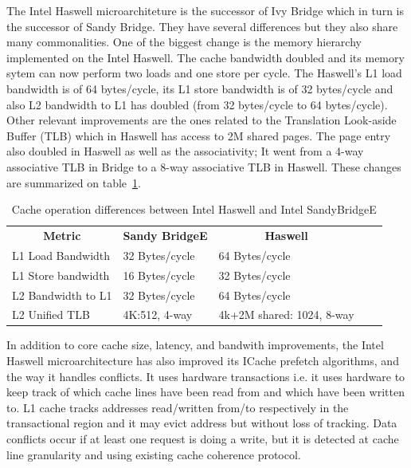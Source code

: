 The Intel Haswell microarchiteture is the successor of Ivy Bridge which in turn is the successor of Sandy Bridge. They have several differences but they also share many commonalities. One of the biggest change is the memory hierarchy implemented on the Intel Haswell. The cache bandwidth doubled and its memory sytem can now perform two loads and one store per cycle. The Haswell's L1 load bandwidth is of 64 bytes/cycle, its L1 store bandwidth is of 32 bytes/cycle and also L2 bandwidth to L1 has doubled (from 32 bytes/cycle to 64 bytes/cycle). Other relevant improvements are the ones related to the Translation Look-aside Buffer (TLB) which in Haswell has access to 2M shared pages. The page entry also doubled in Haswell as well as the associativity; It went from a 4-way associative TLB in 
 Bridge to a 8-way associative TLB in Haswell. These changes are summarized on table~\ref{tab:haswell_ivy}.

\begin{table}[ht]
\footnotesize
\begin{tabular}{|l|l|l|ll}
\cline{1-3}
\multicolumn{1}{|c|}{\textbf{Metric}} & \multicolumn{1}{c|}{\textbf{Sandy BridgeE}} & \multicolumn{1}{c|}{\textbf{Haswell}} &  &  \\ \cline{1-3}
L1 Load Bandwidth                     & 32 Bytes/cycle                           & 64 Bytes/cycle                        &  &  \\ \cline{1-3}
L1 Store bandwidth                    & 16 Bytes/cycle                           & 32 Bytes/cycle                        &  &  \\ \cline{1-3}
L2 Bandwidth to L1                    & 32 Bytes/cycle                           & 64 Bytes/cycle                        &  &  \\ \cline{1-3}
L2 Unified TLB                        & 4K:512, 4-way                            & 4k+2M shared: 1024, 8-way             &  &  \\ \cline{1-3}
\end{tabular}
\caption{Cache operation differences between Intel Haswell and Intel SandyBridgeE}
\label{tab:haswell_ivy}
\end{table}

In addition to core cache size, latency, and bandwith improvements, the Intel Haswell microarchitecture has also improved its ICache prefetch algorithms, and the way it handles conflicts. It uses hardware transactions i.e. it uses hardware to keep track of which cache lines have been read from and which have been written to. L1 cache tracks addresses read/written from/to respectively in the transactional region and it may evict address but without loss of tracking. Data conflicts occur if at least one request is doing a write, but it is detected at cache line granularity and using existing cache coherence protocol.

